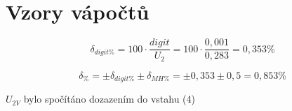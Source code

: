 \section{Vzory vápočtů}
  \begin{equation}
    \delta_{digit\%}  = 100 \cdot \dfrac{digit}{U_2} = 100 \cdot \dfrac{0,001}{0,283} = 0,353 \%
  \end{equation}

  \begin{equation}
    \delta_{\%}  = \pm \delta_{digit\%} \pm \delta_{MH\%} = \pm 0,353 \pm 0,5 = 0,853 \%
  \end{equation}

  $U_{2V}$ bylo spočítáno dozazením do vstahu (4)
